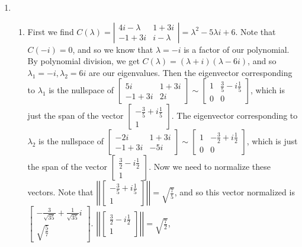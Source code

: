 \documentclass[10pt,english]{article}
\begin{document}
\begin{enumerate}
\pagebreak
\item \begin{enumerate}
    \item First we find $C(\lambda)=\left|\begin{matrix}4i-\lambda&1+3i\\-1+3i&i-\lambda\end{matrix}\right|=\lambda^2-5\lambda i+6$. Note that $C(-i)=0$, and so we know that $\lambda=-i$ is a factor of our polynomial. By polynomial division, we get $C(\lambda)=(\lambda+i)(\lambda-6i)$, and so $\lambda_1=-i,\lambda_2=6i$ are our eigenvalues. Then the eigenvector corresponding to $\lambda_1$ is the nullspace of $\begin{bmatrix}5i&1+3i\\-1+3i&2i\end{bmatrix}\sim\begin{bmatrix}1&\frac{3}{5}-i\frac{1}{5}\\0&0\end{bmatrix}$, which is just the span of the vector $\begin{bmatrix}-\frac{3}{5}+i\frac{1}{5}\\1\end{bmatrix}$. The eigenvector corresponding to $\lambda_2$ is the nullspace of $\begin{bmatrix}-2i&1+3i\\-1+3i&-5i\end{bmatrix}\sim\begin{bmatrix}1&-\frac{3}{2}+i\frac{1}{2}\\0&0\end{bmatrix}$, which is just the span of the vector $\begin{bmatrix}\frac{3}{2}-i\frac{1}{2}\\1\end{bmatrix}$. Now we need to normalize these vectors. Note that $\left|\left|\begin{bmatrix}-\frac{3}{5}+i\frac{1}{5}\\1\end{bmatrix}\right|\right|=\sqrt{\frac{7}{5}}$, and so this vector normalized is $\begin{bmatrix}-\frac{3}{\sqrt{35}}+\frac{1}{\sqrt{35}}i\\\sqrt{\frac{5}{7}}\end{bmatrix}$. $\left|\left|\begin{bmatrix}\frac{3}{2}-i\frac{1}{2}\\1\end{bmatrix}\right|\right|=\sqrt{\frac{7}{2}}$, 
\end{enumerate}
\end{enumerate}
\end{document}
